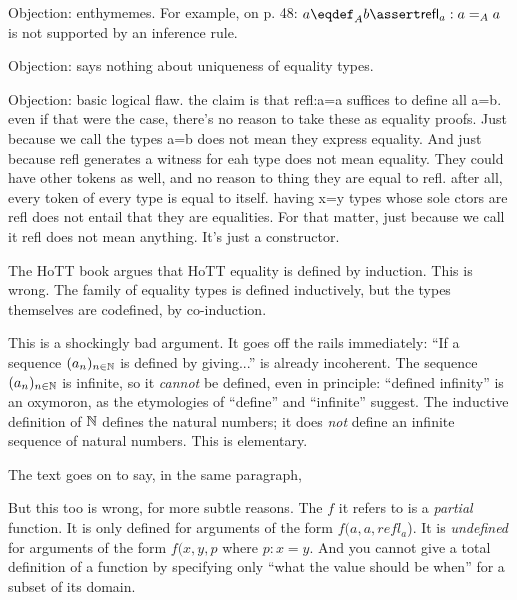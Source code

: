 \documentclass{article}
\begin{document}
Objection: enthymemes. For example, on p. 48: \(a\defn_A
b\linfer\textsf{refl}_a:a=_A a\) is not supported by an inference rule.

Objection: says nothing about uniqueness of equality types.

Objection: basic logical flaw. the claim is that refl:a=a suffices to
define all a=b. even if that were the case, there's no reason to take
these as equality proofs. Just because we call the types a=b does not
mean they express equality. And just because refl generates a witness
for eah type does not mean equality. They could have other tokens as
well, and no reason to thing they are equal to refl. after all, every
token of every type is equal to itself. having x=y types whose sole
ctors are refl does not entail that they are equalities. For that
matter, just because we call it refl does not mean anything. It's just
a constructor.

The HoTT book argues that HoTT equality is defined by induction. This
is wrong. The family of equality types is defined inductively, but the
types themselves are codefined, by co-induction.


This is a shockingly bad argument. It goes off the rails immediately:
\enquote{If a sequence \((a_n)_{n\in\mathbb{N}}\) is defined by giving...}
is already incoherent. The sequence \((a_n)_{n\in\mathbb{N}}\) is infinite,
so it \textit{cannot} be defined, even in principle: ``defined
infinity'' is an oxymoron, as the etymologies of ``define'' and
``infinite'' suggest. The inductive definition of \(\mathbb{N}\) defines the
natural numbers; it does \textit{not} define an infinite sequence of
natural numbers. This is elementary.

The text goes on to say, in the same paragraph, 

But this too is wrong, for more subtle reasons. The \(f\) it refers to
is a \textit{partial} function. It is only defined for arguments of
the form \(f(a,a,refl_a\)). It is \textit{undefined} for arguments of
the form \(f(x,y,p\) where \(p:x=y\). And you cannot give a total
definition of a function by specifying only ``what the value should be
when'' for a subset of its domain.
\end{document}
